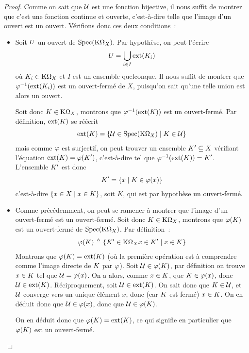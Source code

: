 \begin{proof}
  Comme on sait que $\mathcal{U}$ est une fonction bijective, il nous suffit de
  montrer que c'est une fonction continue et ouverte, c'est-à-dire telle que
  l'image d'un ouvert est un ouvert. Vérifions donc ces deux conditions~:
  \begin{itemize}
  \item Soit $U$ un ouvert de $\operatorname{Spec}(\mathrm{K}\Omega_{X})$. Par hypothèse, on
    peut l'écrire
    \[U = \bigcup_{i\in I} \operatorname{ext}(K_i)\]
    où $K_i\in \mathrm{K}\Omega_{X}$ et $I$ est un ensemble quelconque.
    Il nous suffit de montrer que $\varphi^{-1}(\operatorname{ext}(K_i))$ est un
    ouvert-fermé de $X$, puisqu'on sait qu'une telle union est alors un ouvert.

    Soit donc $K\in \mathrm{K}\Omega_{X}$, montrons que
    $\varphi^{-1}(\operatorname{ext}(K))$ est un ouvert-fermé. Par définition,
    $\operatorname{ext}(K)$ se réécrit
    \[
    \operatorname{ext}(K) = \left\{ \mathcal{U} \in \operatorname{Spec}(\mathrm{K}\Omega_{X}) \;\middle\vert\; K\in\mathcal{U} \right\}
    \]
    mais comme $\varphi$ est surjectif, on peut trouver un ensemble
    $K'\subseteq X$ vérifiant l'équation
    $\operatorname{ext}(K) = \varphi(K')$, c'est-à-dire
    tel que $\varphi^{-1}(\operatorname{ext}(K)) = K'$. L'ensemble $K'$ est donc
    \[K' = \left\{ x \;\middle\vert\; K \in \varphi(x) \right\}\]
    c'est-à-dire $\left\{ x\in X \;\middle\vert\; x\in K \right\}$, soit $K$, qui est par hypothèse
    un ouvert-fermé.
  \item Comme précédemment, on peut se ramener à montrer que l'image d'un
    ouvert-fermé est un ouvert-fermé. Soit donc $K\in\mathrm{K}\Omega_{X}$,
    montrons que $\varphi(K)$ est un ouvert-fermé de
    $\operatorname{Spec}(\mathrm{K}\Omega_{X})$. Par définition~:
    \[\varphi(K) \triangleq
    \left\{ {K' \in \mathrm{K}\Omega_{X}}{x \in K'} \;\middle\vert\; x \in K \right\}\]
    Montrons que $\varphi(K) = \operatorname{ext}(K)$ (où la première opération est
    à comprendre comme l'image directe de $K$ par $\varphi$).
    Soit $\mathcal{U} \in \varphi(K)$, par définition on trouve $x\in K$
    tel que $\mathcal{U} = \varphi(x)$.
    On a alors, comme $x\in K$, que $K\in \varphi(x)$, donc
    $\mathcal{U} \in \operatorname{ext}(K)$. Réciproquement, soit $\mathcal{U} \in \operatorname{ext}(K)$.
    On sait donc que $K\in \mathcal{U}$, et $\mathcal{U}$ converge vers un
    unique élément $x$, donc (car $K$ est fermé) $x\in K$.
    On en déduit donc que $\mathcal{U} \in\varphi(x)$, donc que
    $\mathcal{U} \in \varphi(K)$.

    On en déduit donc que $\varphi(K) = \operatorname{ext}(K)$, ce qui signifie en
    particulier que $\varphi(K)$ est un ouvert-fermé. \qedhere
  \end{itemize}
\end{proof}

